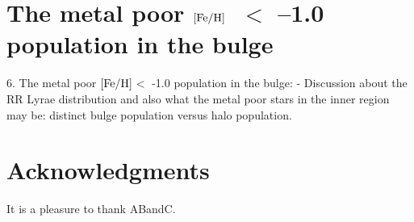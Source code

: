 \documentclass[12pt, preprint]{aastex}
\newcommand{\feh}{\mbox{$\rm [Fe/H]$}}
\begin{document}
\section{The metal poor \feh\ $<$ --1.0 population in the bulge} 

6. The metal poor \feh $<$ -1.0 population in the bulge: - Discussion about the
RR Lyrae distribution and also what the metal poor stars in the inner region may be: distinct bulge population versus halo population.

\section*{Acknowledgments}
It is a pleasure to thank ABandC.



\end{document}
